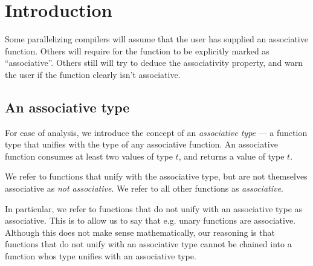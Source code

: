 \section{Introduction}

Some parallelizing compilers will assume that the user has supplied an
associative function. Others will require for the function to be explicitly
marked as ``associative''. Others still will try to deduce the associativity
property, and warn the user if the function clearly isn't associative.

\subsection{An associative type}

For ease of analysis, we introduce the concept of an \emph{associative type}
--- a function type that unifies with the type of any associative function. An
associative function consumes at least two values of type $t$, and returns a
value of type $t$.

We refer to functions that unify with the associative type, but are not
themselves associative as \emph{not associative}. We refer to all other
functions as \emph{associative}.

In particular, we refer to functions that do not unify with an associative type
as associative. This is to allow us to say that e.g. unary functions are
associative. Although this does not make sense mathematically, our reasoning is
that functions that do not unify with an associative type cannot be chained
into a function whos type unifies with an associative type.

